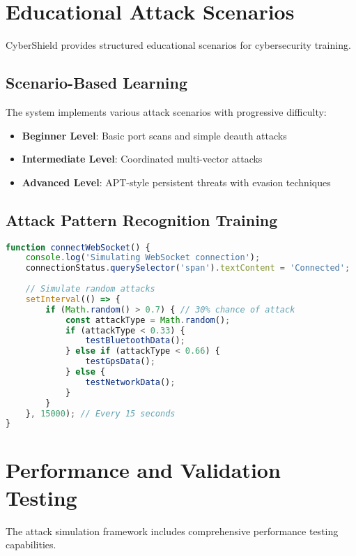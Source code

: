 \documentclass[12pt,a4paper]{report}
\begin{document}
\section{Educational Attack Scenarios}

CyberShield provides structured educational scenarios for cybersecurity training.

\subsection{Scenario-Based Learning}

The system implements various attack scenarios with progressive difficulty:

\begin{itemize}
    \item \textbf{Beginner Level}: Basic port scans and simple deauth attacks
    \item \textbf{Intermediate Level}: Coordinated multi-vector attacks
    \item \textbf{Advanced Level}: APT-style persistent threats with evasion techniques
\end{itemize}

\subsection{Attack Pattern Recognition Training}

\begin{lstlisting}[language=JavaScript,caption={Automatic Attack Generation for Training}]
function connectWebSocket() {
    console.log('Simulating WebSocket connection');
    connectionStatus.querySelector('span').textContent = 'Connected';
    
    // Simulate random attacks
    setInterval(() => {
        if (Math.random() > 0.7) { // 30% chance of attack
            const attackType = Math.random();
            if (attackType < 0.33) {
                testBluetoothData();
            } else if (attackType < 0.66) {
                testGpsData();
            } else {
                testNetworkData();
            }
        }
    }, 15000); // Every 15 seconds
}
\end{lstlisting}

\section{Performance and Validation Testing}

The attack simulation framework includes comprehensive performance testing capabilities.
\end{document}
